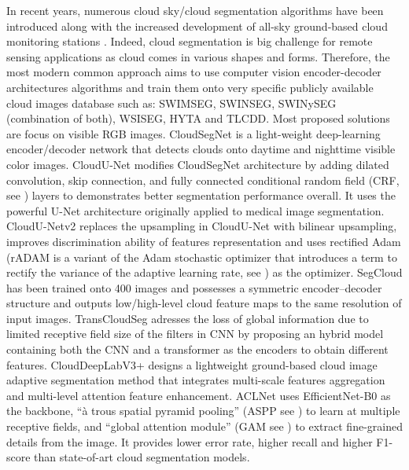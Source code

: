 \documentclass[amt, article]{copernicus}
\begin{document}
In recent years, numerous cloud sky/cloud segmentation algorithms have been introduced along with the increased development of all-sky ground-based cloud monitoring stations \citep{Long2006, Yang2012, rs12111902, ASC2, amt-15-3629-2022}.
Indeed, cloud segmentation is big challenge for remote sensing applications as cloud comes in various shapes and forms. Therefore, the most modern common approach aims to use computer vision encoder-decoder architectures algorithms and train them onto very specific publicly available cloud images database such as: SWIMSEG, SWINSEG, SWINySEG (combination of both), WSISEG, HYTA and TLCDD. Most proposed solutions are focus on visible RGB images.
CloudSegNet \citep{dev2019cloudsegnet} is a light-weight deep-learning encoder/decoder network that detects clouds onto daytime and nighttime visible color images.
CloudU-Net \citep{CloudUNet} modifies CloudSegNet architecture by adding dilated convolution, skip connection, and fully connected conditional random field (CRF, see \citet{McCallumCRF}) layers to demonstrates better segmentation performance overall. It uses the powerful U-Net architecture \citep{UNET} originally applied to medical image segmentation.
CloudU-Netv2 \citep{CloudUNetv2} replaces the upsampling in CloudU-Net with bilinear upsampling, improves discrimination ability of features representation and uses rectified Adam (rADAM is a variant of the Adam \cite{ADAM} stochastic optimizer that introduces a term to rectify the variance of the adaptive learning rate, see \citet{RADAM}) as the optimizer.
SegCloud \citep{SegCloud} has been trained onto 400 images and possesses a symmetric encoder–decoder structure and outputs low/high-level cloud feature maps to the same resolution of input images.
TransCloudSeg \citep{TransCloudSeg} adresses the loss of global information due to limited receptive field size of the filters in CNN by proposing an hybrid model containing both the CNN and a transformer \citep{TRANSFORMER} as the encoders to obtain different features.
CloudDeepLabV3+ \citep{CloudDeepLabV3} designs a lightweight ground-based cloud image adaptive segmentation method  that integrates multi-scale fea­tures aggregation and multi-level attention feature enhancement.
ACLNet \citep{makwana2022aclnet} uses EfficientNet-B0 as the backbone, “à trous spatial pyramid pooling” (ASPP see \citet{ATROUS}) to learn at multiple receptive fields, and “global attention module” (GAM see \citet{GAM}) to extract fine-grained details from the image. It provides lower error rate, higher recall and higher F1-score than state-of-art cloud segmentation models.
\end{document}

